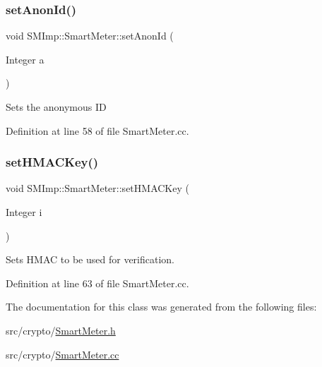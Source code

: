 \subsubsection{\texorpdfstring{set\+Anon\+Id()}{setAnonId()}}
{\footnotesize\ttfamily void S\+M\+Imp\+::\+Smart\+Meter\+::set\+Anon\+Id (\begin{DoxyParamCaption}\item[{Integer}]{a }\end{DoxyParamCaption})}

Sets the anonymous ID 

Definition at line 58 of file Smart\+Meter.\+cc.

\mbox{\label{classSMImp_1_1SmartMeter_a577ec9d3df97e40c63e15f3d2f1847af}} 
\subsubsection{\texorpdfstring{set\+H\+M\+A\+C\+Key()}{setHMACKey()}}
{\footnotesize\ttfamily void S\+M\+Imp\+::\+Smart\+Meter\+::set\+H\+M\+A\+C\+Key (\begin{DoxyParamCaption}\item[{Integer}]{i }\end{DoxyParamCaption})}

Sets H\+M\+AC to be used for verification. 

Definition at line 63 of file Smart\+Meter.\+cc.



The documentation for this class was generated from the following files\+:\begin{DoxyCompactItemize}
\item 
src/crypto/\hyperlink{crypto_2SmartMeter_8h}{Smart\+Meter.\+h}\item 
src/crypto/\hyperlink{crypto_2SmartMeter_8cc}{Smart\+Meter.\+cc}\end{DoxyCompactItemize}
